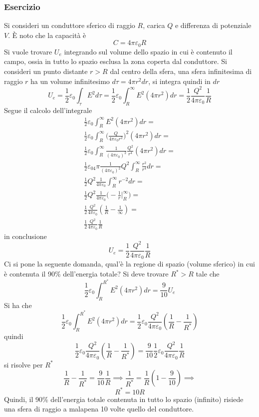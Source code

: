 \documentclass[10pt, letterpaper]{report}
\begin{document}
\subsubsection{Esercizio}
Si consideri un conduttore sferico di raggio $R$, carica $Q$ e differenza di potenziale $V$. È noto che la capacità è $$ C=4\pi\varepsilon_0R$$
Si vuole trovare $U_e$ integrando sul volume dello spazio in cui è contenuto il campo, ossia in tutto lo spazio esclusa la zona coperta dal conduttore.\acc 
Si consideri un punto distante $r>R$ dal centro della sfera, una sfera infinitesima di raggio $r$ ha un volume infinitesimo $d\tau=4\pi r^2dr$, si integra quindi in $dr$ 
$$ U_e=\frac{1}{2}\varepsilon_0\int_\tau E^2d\tau = \frac{1}{2}\varepsilon_0\int_R^\infty E^2(4\pi r^2)dr=\frac{1}{2}\frac{Q^2}{4\pi\varepsilon_0}\frac{1}{R}$$
Segue il calcolo dell'integrale
\begin{eqnarray}
    \frac{1}{2}\varepsilon_0\int_R^\infty E^2(4\pi r^2)dr=\\ 
    \frac{1}{2}\varepsilon_0\int_R^\infty \Big( \frac{Q}{4\pi\varepsilon_0r^2} \Big)^2(4\pi r^2)dr=\\ 
    \frac{1}{2}\varepsilon_0\int_R^\infty \frac{1}{(4\pi\varepsilon_0)^2}\frac{Q^2}{r^4}(4\pi r^2)dr=\\ 
   \frac{1}{2}\varepsilon_04\pi\frac{1}{(4\pi\varepsilon_0)^2}Q^2\int_R^\infty\frac{r^2}{r^4}dr=\\ 
   \frac{1}{2}Q^2\frac{1}{4\pi\varepsilon_0}\int_R^\infty r^{-2}dr = \\
   \frac{1}{2}Q^2\frac{1}{4\pi\varepsilon_0}\Big(-\frac{1}{r}\Bigg |_R^\infty\Big) = \\ 
   \frac{1}{2}\frac{Q^2}{4\pi\varepsilon_0}(\frac{1}{R}-\frac{1}{\infty})= \\
   \frac{1}{2}\frac{Q^2}{4\pi\varepsilon_0}\frac{1}{R}
\end{eqnarray}
in conclusione
$$U_e  =\frac{1}{2}\frac{Q^2}{4\pi\varepsilon_0}\frac{1}{R}$$
Ci si pone la seguente domanda, qual'è la regione di spazio (volume sferico) in cui è contenuta il 90\% dell'energia totale? Si deve trovare $R^*>R$ tale che 
$$ \frac{1}{2}\varepsilon_0\int_{R}^{R^*} E^2(4\pi r^2)dr=\frac{9}{10}U_e$$
Si ha che 
$$\frac{1}{2}\varepsilon_0\int_{R}^{R^*} E^2(4\pi r^2)dr=\frac{1}{2}\varepsilon_0\frac{Q^2}{4\pi\varepsilon_0}(\frac{1}{R}-\frac{1}{R^*}) $$
quindi 
$$ \frac{1}{2}\varepsilon_0\frac{Q^2}{4\pi\varepsilon_0}(\frac{1}{R}-\frac{1}{R^*}) =\frac{9}{10}
\frac{1}{2}\varepsilon_0\frac{Q^2}{4\pi\varepsilon_0}\frac{1}{R} $$
si risolve per $R^*$
$$ \frac{1}{R}-\frac{1}{R^*}=\frac{9}{10}\frac{1}{R}\implies \frac{1}{R^*}=\frac{1}{R}(1-\frac{9}{10})\implies$$
$$ R^*=10R$$
Quindi, il 90\% dell'energia totale contenuta in tutto lo spazio (infinito) risiede una sfera di raggio a malapena 10 volte quello del conduttore.
\end{document}
